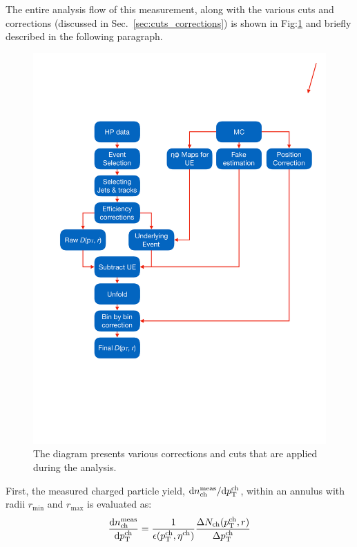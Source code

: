 The entire analysis flow of this measurement, along with the various cuts and corrections (discussed in Sec.~\ref{sec:cuts_corrections}) is shown in Fig:\ref{Fig:analysis_flow} and briefly described in the following paragraph.

\begin{figure}
\centerline{
\includegraphics[width=20.cm]{figures/main/general/Shape_analyses_flow.pdf}
}
\caption{The diagram presents various corrections and cuts that are applied during the analysis.}
\label{Fig:analysis_flow}
\end{figure}

First, the measured charged particle yield, $\text{d}n^{\text{meas}}_{\text{ch}}/\text{d}\mbox{$p_{{\mathrm{T}}}^{\mathrm{ch}}$}$, within an annulus with radii $r_{\text{min}}$ and $r_{\text{max}}$ is evaluated as:
\begin{equation}
\frac{\text{d}n^{\text{meas}}_{\text{ch}}}{\text{d}\mbox{$p_{{\mathrm{T}}}^{\mathrm{ch}}$}} = \frac{1}{\epsilon(\mbox{$p_{\mathrm{T}}^{\mathrm{ch}}$}, \mbox{$\eta^{\mathrm{ch}}$})} \frac{\Delta N_{\text{ch}} (\mbox{$p_{{\mathrm{T}}}^{\mathrm{ch}}$}, r)}{\Delta \mbox{$p_{{\mathrm{T}}}^{\mathrm{ch}}$}}
\end{equation}

